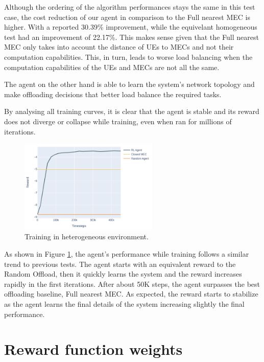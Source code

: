 Although the ordering of the algorithm performances stays the same in this test case, the cost reduction of our agent in comparison to the Full nearest MEC is higher. With a reported 30.39\% improvement, while the equivelant homogeneous test had an improvement of 22.17\%. This makes sense given that the Full nearest MEC only takes into account the distance of \acrshort{UE}s to \acrshort{MEC}s and not their computation capabilities. This, in turn, leads to worse load balancing when the computation capabilities of the \acrshort{UE}s and \acrshort{MEC}s are not all the same.

The agent on the other hand is able to learn the system's network topology and make offloading decisions that better load balance the required tasks. 

By analysing all training curves, it is clear that the agent is stable and its reward does not diverge or collapse while training, even when ran for millions of iterations.

\begin{figure}[H]
  \centering
  \includegraphics[width=250px]{images/5_10_training_hetero.png}
  \caption{Training in heterogeneous environment.}  \label{hetero_training}
\end{figure}

As shown in Figure \ref{hetero_training}, the agent's performance while training follows a similar trend to previous tests. The agent starts with an equivalent reward to the Random Offload, then it quickly learns the system and the reward increases rapidly in the first iterations. After about 50K steps, the agent surpasses the best offloading baseline, Full nearest MEC. As expected, the reward starts to stabilize as the agent learns the final details of the system increasing slightly the final performance.

\section{Reward function weights} \label{reward_section}

